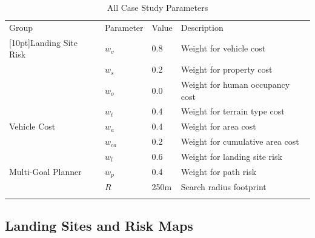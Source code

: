 \begin{table}[ht]
\centering
\caption[Emergency Landing Case Study Parameters]{All Case Study Parameters}
\label{table:ch5_weights}
\begin{tabular}{@{}llll@{}}
\hline\noalign{\smallskip}
Group                                           & Parameter    & Value                     & Description                \\ 
\noalign{\smallskip}\hline\noalign{\smallskip}
\multirow{3}{*}[10pt]{Landing Site Risk}        & $w_v$         & 0.8                       & Weight for vehicle cost    \\
                                                & $w_s$        & 0.2                       & Weight for property cost \\
                                                & $w_o$        & 0.0                       & Weight for human occupancy cost   \\
\multirow{3}{*}[10pt]{Vehicle Cost}        & $w_t$         & 0.4                       & Weight for terrain type cost    \\
                                                & $w_a$        & 0.4                       & Weight for area cost \\
                                                & $w_{ca}$        & 0.2                       & Weight for cumulative area cost   \\
\multirow{3}{*}[10pt]{Multi-Goal Planner}       & $w_l$        & 0.6                       & Weight for landing site risk    \\
                                                & $w_p$        & 0.4                       & Weight for path risk   \\
                                                & $R$        & 250m                       & Search radius footprint   \\
\noalign{\smallskip}\hline\noalign{\smallskip}
\end{tabular}
\end{table}

\subsection{Landing Sites and Risk Maps}\label{sec:ch5_generated_maps}

